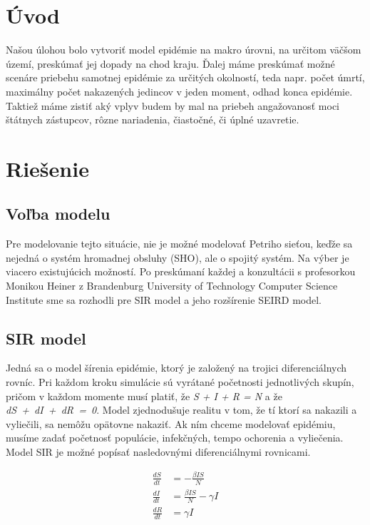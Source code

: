 \documentclass{article}
\begin{document}
\begin{sloppypar}

\section{Úvod}
   Našou úlohou bolo vytvoriť model epidémie na makro úrovni, na určitom väčšom území, preskúmať jej dopady na chod kraju. Ďalej máme preskúmať možné scenáre priebehu samotnej epidémie za určitých okolností, teda napr. počet úmrtí, maximálny počet nakazených jedincov v jeden moment, odhad konca epidémie. Taktiež máme zistiť aký vplyv budem by mal na priebeh angažovanosť moci štátnych zástupcov, rôzne nariadenia, čiastočné, či úplné uzavretie.
 
\section{Riešenie}
       
    \subsection{Voľba modelu}
    Pre modelovanie tejto situácie, nie je možné modelovať Petriho sieťou, keďže sa nejedná o systém hromadnej obsluhy (SHO), ale o spojitý systém. Na výber je viacero existujúcich možností. Po preskúmaní každej a konzultácii s profesorkou Monikou Heiner z Brandenburg University of Technology Computer Science Institute sme sa rozhodli pre SIR model a jeho rozšírenie SEIRD model.
    
    \subsection{SIR model}
    Jedná sa o model šírenia epidémie, ktorý je založený na trojici diferenciálnych rovníc. Pri každom kroku simulácie sú vyrátané početnosti jednotlivých skupín, pričom v každom momente musí platiť, že \textit{S + I + R = N} a že \textit{dS~+~dI~+~dR~=~0}. Model zjednodušuje realitu v tom, že tí ktorí sa nakazili a vyliečili, sa nemôžu opätovne nakaziť. Ak ním chceme modelovať epidémiu, musíme zadať početnosť populácie, infekčných, tempo ochorenia a vyliečenia. Model SIR je možné popísať nasledovnými diferenciálnymi rovnicami. 
    
        \begin{align}
            \frac{dS}{dt} &= -\frac{\beta IS}{N}\\
            \frac{dI}{dt} &= \frac{\beta IS}{N} - \gamma I\\
            \frac{dR}{dt} &= \gamma I
        \end{align}
        

\end{sloppypar}
\end{document}

